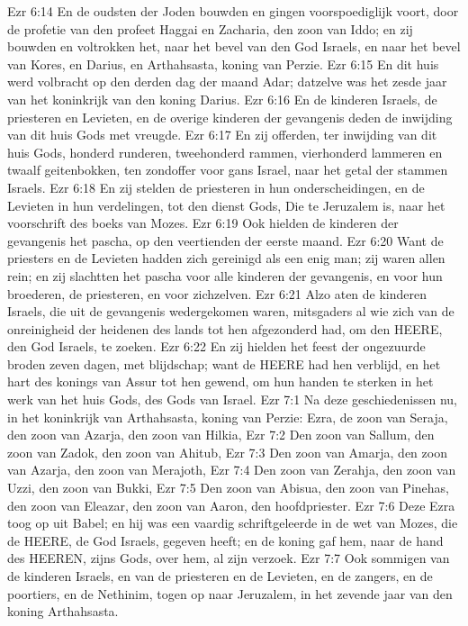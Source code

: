 Ezr 6:14  En de oudsten der Joden bouwden en gingen voorspoediglijk voort, door de profetie van den profeet Haggai en Zacharia, den zoon van Iddo; en zij bouwden en voltrokken het, naar het bevel van den God Israels, en naar het bevel van Kores, en Darius, en Arthahsasta, koning van Perzie.
Ezr 6:15  En dit huis werd volbracht op den derden dag der maand Adar; datzelve was het zesde jaar van het koninkrijk van den koning Darius.
Ezr 6:16  En de kinderen Israels, de priesteren en Levieten, en de overige kinderen der gevangenis deden de inwijding van dit huis Gods met vreugde.
Ezr 6:17  En zij offerden, ter inwijding van dit huis Gods, honderd runderen, tweehonderd rammen, vierhonderd lammeren en twaalf geitenbokken, ten zondoffer voor gans Israel, naar het getal der stammen Israels.
Ezr 6:18  En zij stelden de priesteren in hun onderscheidingen, en de Levieten in hun verdelingen, tot den dienst Gods, Die te Jeruzalem is, naar het voorschrift des boeks van Mozes.
Ezr 6:19  Ook hielden de kinderen der gevangenis het pascha, op den veertienden der eerste maand.
Ezr 6:20  Want de priesters en de Levieten hadden zich gereinigd als een enig man; zij waren allen rein; en zij slachtten het pascha voor alle kinderen der gevangenis, en voor hun broederen, de priesteren, en voor zichzelven.
Ezr 6:21  Alzo aten de kinderen Israels, die uit de gevangenis wedergekomen waren, mitsgaders al wie zich van de onreinigheid der heidenen des lands tot hen afgezonderd had, om den HEERE, den God Israels, te zoeken.
Ezr 6:22  En zij hielden het feest der ongezuurde broden zeven dagen, met blijdschap; want de HEERE had hen verblijd, en het hart des konings van Assur tot hen gewend, om hun handen te sterken in het werk van het huis Gods, des Gods van Israel.
Ezr 7:1  Na deze geschiedenissen nu, in het koninkrijk van Arthahsasta, koning van Perzie: Ezra, de zoon van Seraja, den zoon van Azarja, den zoon van Hilkia,
Ezr 7:2  Den zoon van Sallum, den zoon van Zadok, den zoon van Ahitub,
Ezr 7:3  Den zoon van Amarja, den zoon van Azarja, den zoon van Merajoth,
Ezr 7:4  Den zoon van Zerahja, den zoon van Uzzi, den zoon van Bukki,
Ezr 7:5  Den zoon van Abisua, den zoon van Pinehas, den zoon van Eleazar, den zoon van Aaron, den hoofdpriester.
Ezr 7:6  Deze Ezra toog op uit Babel; en hij was een vaardig schriftgeleerde in de wet van Mozes, die de HEERE, de God Israels, gegeven heeft; en de koning gaf hem, naar de hand des HEEREN, zijns Gods, over hem, al zijn verzoek.
Ezr 7:7  Ook sommigen van de kinderen Israels, en van de priesteren en de Levieten, en de zangers, en de poortiers, en de Nethinim, togen op naar Jeruzalem, in het zevende jaar van den koning Arthahsasta.
